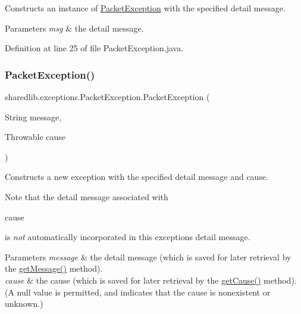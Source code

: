 Constructs an instance of {\ttfamily \hyperlink{classsharedlib_1_1exceptions_1_1_packet_exception}{Packet\+Exception}} with the specified detail message.


\begin{DoxyParams}{Parameters}
{\em msg} & the detail message. \\
\hline
\end{DoxyParams}


Definition at line 25 of file Packet\+Exception.\+java.

\hypertarget{classsharedlib_1_1exceptions_1_1_packet_exception_a025bed31b5c6215d72292f5a030e014f}{}\label{classsharedlib_1_1exceptions_1_1_packet_exception_a025bed31b5c6215d72292f5a030e014f} 
\subsubsection{\texorpdfstring{Packet\+Exception()}{PacketException()}\hspace{0.1cm}{\footnotesize\ttfamily [3/4]}}
{\footnotesize\ttfamily sharedlib.\+exceptions.\+Packet\+Exception.\+Packet\+Exception (\begin{DoxyParamCaption}\item[{String}]{message,  }\item[{Throwable}]{cause }\end{DoxyParamCaption})}

Constructs a new exception with the specified detail message and cause. 

Note that the detail message associated with
\begin{DoxyCode}
cause 
\end{DoxyCode}
 is {\itshape not} automatically incorporated in this exception\textquotesingle{}s detail message.


\begin{DoxyParams}{Parameters}
{\em message} & the detail message (which is saved for later retrieval by the \hyperlink{}{get\+Message()} method). \\
\hline
{\em cause} & the cause (which is saved for later retrieval by the \hyperlink{}{get\+Cause()} method). (A {\ttfamily null} value is permitted, and indicates that the cause is nonexistent or unknown.) \\
\hline
\end{DoxyParams}



